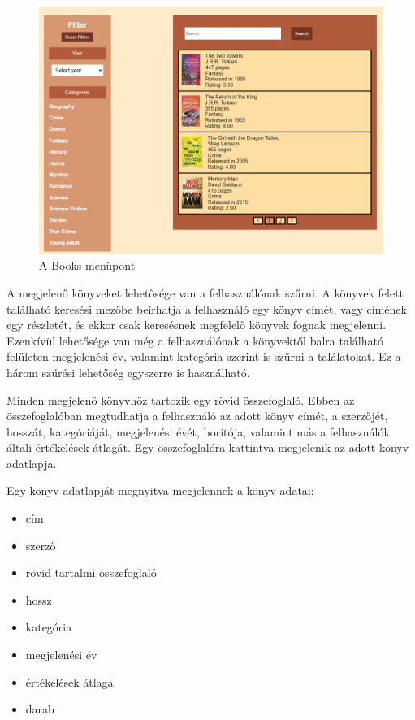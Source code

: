 \begin{figure}[H]
\centering
\includegraphics[scale=0.5]{images/application/books.png}
\caption{A Books menüpont}
\end{figure}

\bigskip

A megjelenő könyveket lehetősége van a felhasználónak szűrni. A könyvek felett található keresési mezőbe beírhatja a felhasználó egy könyv címét, vagy címének egy részletét, és ekkor csak keresésnek megfelelő könyvek fognak megjelenni. Ezenkívül lehetősége van még a felhasználónak a könyvektől balra található felületen megjelenési év, valamint kategória szerint is szűrni a találatokat. Ez a három szűrési lehetőség egyszerre is használható.

\bigskip

Minden megjelenő könyvhöz tartozik egy rövid összefoglaló. Ebben az összefoglalóban megtudhatja a felhasználó az adott könyv címét, a szerzőjét, hosszát, kategóriáját, megjelenési évét, borítója, valamint más a felhasználók általi értékelések átlagát. Egy összefoglalóra kattintva megjelenik az adott könyv adatlapja.



\bigskip

Egy könyv adatlapját megnyitva megjelennek a könyv adatai: 
\begin{itemize}
    \item cím
    \item szerző
    \item rövid tartalmi összefoglaló
    \item hossz
    \item kategória
    \item megjelenési év
    \item értékelések átlaga
    \item darab
\end{itemize}

